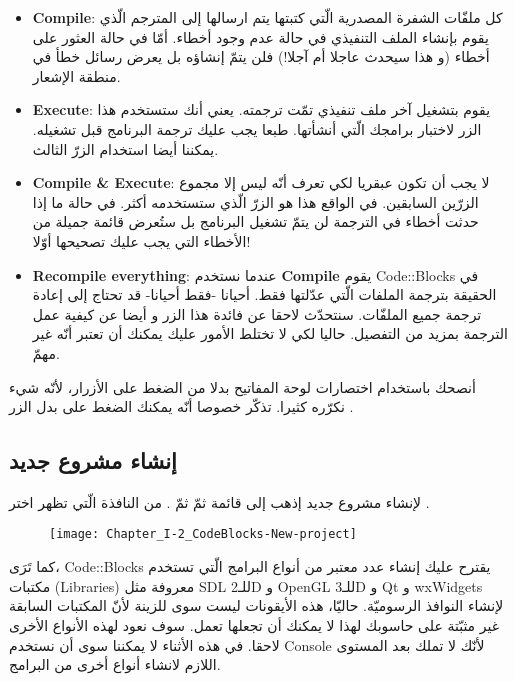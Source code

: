 \begin{itemize}
  \item \textbf{\textenglish{Compile}}:
كل ملفّات الشفرة المصدرية الّتي كتبتها يتم ارسالها إلى المترجم الّذي يقوم بإنشاء الملف التنفيذي في حالة عدم وجود أخطاء. أمّا في حالة العثور على أخطاء (و هذا سيحدث عاجلا أم آجلا!) فلن يتمّ إنشاؤه بل يعرض رسائل خطأ في منطقة الإشعار.
  \item \textbf{\textenglish{Execute}}:
يقوم بتشغيل آخر ملف تنفيذي تمّت ترجمته. يعني أنك ستستخدم هذا الزر لاختبار برامجك الّتي أنشأتها. طبعا يجب عليك ترجمة البرنامج قبل تشغيله. يمكننا أيضا استخدام الزرّ الثالث.
  \item \textbf{\textenglish{Compile \& Execute}}:
لا يجب أن تكون عبقريا لكي تعرف أنّه ليس إلا مجموع الزرّين السابقين. في الواقع هذا هو الزرّ الّذي ستستخدمه أكثر. في حالة ما إذا حدثت أخطاء في الترجمة لن يتمّ تشغيل البرنامج بل ستُعرض قائمة جميلة من الأخطاء التي يجب عليك تصحيحها أوّلا!
  \item \textbf{\textenglish{Recompile everything}}:
 عندما نستخدم
\textbf{\textenglish{Compile}}
يقوم
\textenglish{Code::Blocks}
في الحقيقة بترجمة الملفات الّتي عدّلتها فقط. أحيانا -فقط أحيانا- قد تحتاج إلى إعادة ترجمة جميع الملفّات. سنتحدّث لاحقا عن فائدة هذا الزر و أيضا عن كيفية عمل الترجمة بمزيد من التفصيل. حاليا لكي لا تختلط الأمور عليك يمكنك أن تعتبر أنّه غير مهمّ.
\end{itemize}

\begin{information}
أنصحك باستخدام اختصارات لوحة المفاتيح بدلا من الضغط على الأزرار، لأنّه شيء نكرّره كثيرا. تذكّر خصوصا أنّه يمكنك الضغط على
بدل الزر
.
\end{information}

\subsection{إنشاء مشروع جديد}

لإنشاء مشروع جديد إذهب إلى قائمة
ثمّ
ثمّ
.
من النافذة الّتي تظهر اختر
.

\begin{figure}[H]
	\centering
	\texttt{[image: Chapter\_I-2\_CodeBlocks-New-project]}
\end{figure}

\begin{information}
كما تَرَى،
\textenglish{Code::Blocks}
يقترح عليك إنشاء عدد معتبر من أنواع البرامج الّتي تستخدم مكتبات
(\textenglish{Libraries})
معروفة مثل
\textenglish{SDL}
للـ\textenglish{2D}
و
\textenglish{OpenGL}
للـ\textenglish{3D}
و
\textenglish{Qt}
و
\textenglish{wxWidgets}
لإنشاء النوافذ الرسوميّة. حاليّا، هذه الأيقونات ليست سوى للزينة لأنّ المكتبات السابقة غير مثبّتة على حاسوبك لهذا لا يمكنك أن تجعلها تعمل. سوف نعود لهذه الأنواع الأخرى لاحقا. في هذه الأثناء لا يمكننا سوى أن نستخدم \textenglish{Console}
لأنّك لا تملك بعد المستوى اللازم لانشاء أنواع أخرى من البرامج.
\end{information}

